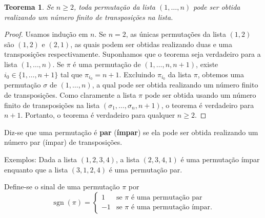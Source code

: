 \documentclass[12pt,a4paper]{report}
\newcommand{\tb}{\textbf}
\newtheorem{thm}{Teorema}[chapter]
\DeclareMathOperator{\sgn}{sgn}
\begin{document}
\begin{thm}
  Se $n\ge 2$, toda permutação da lista $(1,\ldots,n)$ pode ser obtida realizando um número finito de transposições na lista.
\end{thm}
\begin{proof}
  Usamos indução em $n$. Se $n=2$, as únicas permutações da lista $(1,2)$ são $(1,2)$ e $(2,1)$, as quais podem ser obtidas realizando duas e uma transposições respectivamente. Suponhamos que o teorema seja verdadeiro para a lista $(1,\ldots,n)$. Se $\pi$ é uma permutação de $(1,\ldots,n,n+1)$, existe $i_0\in\{1,\ldots,n+1\}$ tal que $\pi_{i_0}=n+1$.
  Excluindo $\pi_{i_0}$ da lista $\pi$, obtemos uma permutação $\sigma$ de $(1,\ldots,n)$, a qual pode ser obtida realizando um número finito de transposições. Como claramente a lista $\pi$ pode ser obtida usando um número finito de transposições na lista $(\sigma_1,\ldots,\sigma_n,n+1)$, o teorema é verdadeiro para $n+1$. Portanto, o teorema é verdadeiro para qualquer $n\ge 2$.
\end{proof}

Diz-se que uma permutação é \tb{par} (\tb{ímpar}) se ela pode ser obtida realizando um número par (ímpar) de transposições.

Exemplos: Dada a lista $(1,2,3,4)$, a lista $(2,3,4,1)$ é uma permutação ímpar enquanto que a lista $(3,1,2,4)$ é uma permutação par.

Define-se o sinal de uma permutação $\pi$ por
$$\sgn(\pi)=\begin{cases}
  1&\text{se $\pi$ é uma permutação par}\\
  -1&\text{se $\pi$ é uma permutação ímpar.}
\end{cases}$$
\end{document}
